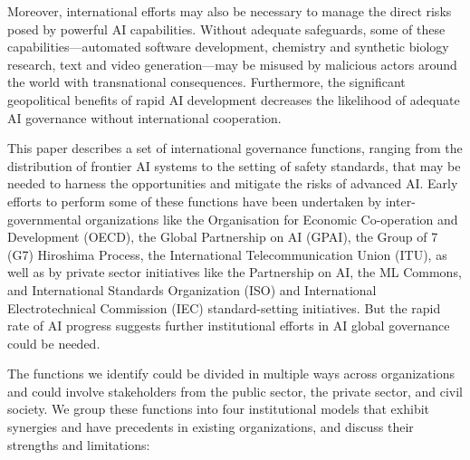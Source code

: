 \documentclass[12pt]{article}
\begin{document}
Moreover, international efforts may also be necessary to manage the
direct risks posed by powerful AI capabilities. Without adequate
safeguards, some of these capabilities---automated software development,
chemistry and synthetic biology research, text and video
generation---may be misused by malicious actors around the world with
transnational consequences. Furthermore, the significant geopolitical
benefits of rapid AI development decreases the likelihood of adequate AI
governance without international cooperation.

This paper describes a set of international governance functions,
ranging from the distribution of frontier AI systems to the setting of
safety standards, that may be needed to harness the opportunities and
mitigate the risks of advanced AI. Early efforts to perform some of
these functions have been undertaken by inter-governmental organizations
like the Organisation for Economic Co-operation and Development (OECD),
the Global Partnership on AI (GPAI), the Group of 7 (G7) Hiroshima Process,
the International Telecommunication Union (ITU), as well as by private sector 
initiatives like the Partnership on AI, the ML Commons, and International Standards
Organization (ISO) and International Electrotechnical Commission (IEC)
standard-setting initiatives. But the rapid rate of AI progress suggests
further institutional efforts in AI global governance could be needed.

The functions we identify could be divided in multiple ways across
organizations and could involve stakeholders from the public sector, the
private sector, and civil society. We group these functions into four
institutional models that exhibit synergies and have precedents in
existing organizations, and discuss their strengths and limitations:
\end{document}

